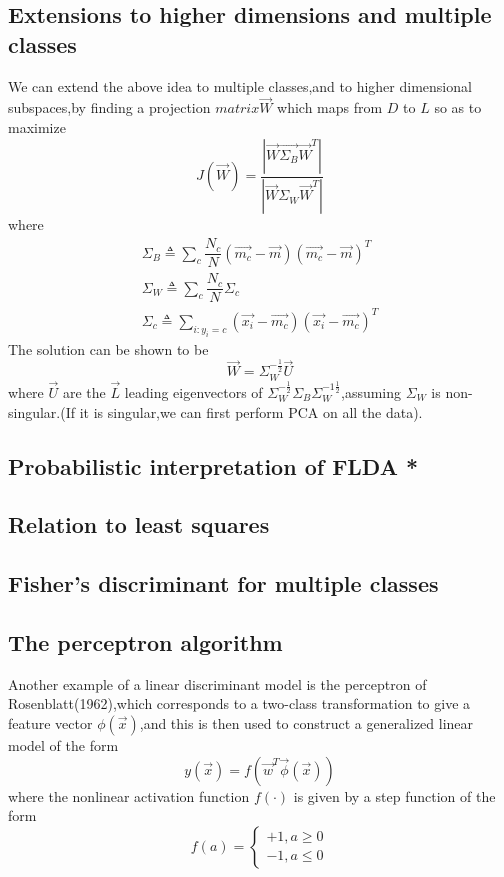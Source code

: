 \subsection{Extensions to higher dimensions and multiple classes}
We can extend the above idea to multiple classes,and to higher dimensional subspaces,by finding a projection $matrix \vec{W}$ which maps from $D$ to $L$ so as to maximize
\begin{equation}
J(\vec{W}) = \dfrac{|\vec{W}\vec{\Sigma_B}\vec{W}^T|}{|\vec{W}\Sigma_W\vec{W}^T|}
\end{equation}
where
\begin{eqnarray}
\Sigma_B \triangleq \sum_{c}{\dfrac{N_c}{N}(\vec{m_c}-\vec{m})(\vec{m_c}-\vec{m})^T} \\
\Sigma_W \triangleq \sum_{c}\dfrac{N_c}{N}\Sigma_c \\
\Sigma_c \triangleq \sum_{i:y_i=c}(\vec{x_i}-\vec{m_c})(\vec{x_i}-\vec{m_c})^T
\end{eqnarray}
The solution can be shown to be
\begin{equation}
\vec{W} = \Sigma_W^{-\frac{1}{2}}\vec{U}
\end{equation}
where $\vec{U}$ are the $\vec{L}$ leading eigenvectors of $\Sigma_W^{-\frac{1}{2}}\Sigma_B\Sigma_W^{-1\frac{1}{2}}$,assuming $\Sigma_W$ is non-singular.(If it is singular,we can first perform PCA on all the data).
\subsection{Probabilistic interpretation of FLDA *}
\subsection{Relation to least squares}
\subsection{Fisher's discriminant for multiple classes}
\subsection{The perceptron algorithm}
Another example of a linear discriminant model is the perceptron of Rosenblatt(1962),which corresponds to a two-class transformation to give a feature vector $\phi(\vec{x})$,and this is then used to construct a generalized linear model of the form
\begin{equation}
y(\vec{x}) = f(\vec{w}^T\vec{\phi}(\vec{x}))
\end{equation}
where the nonlinear activation function $f(\cdot)$ is given by a step function of the form
\begin{equation}
f(a) = \begin{cases}
+1,a \geq 0 \\
-1,a \leq 0
\end{cases}
\end{equation}

